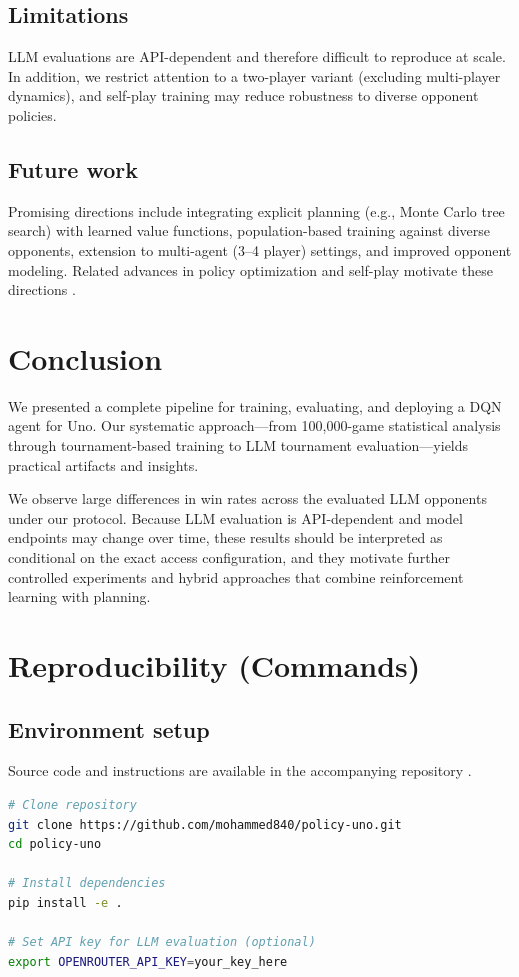 \documentclass[11pt]{article}
\begin{document}
\subsection{Limitations}
LLM evaluations are API-dependent and therefore difficult to reproduce at scale. In addition, we restrict attention to a two-player variant (excluding multi-player dynamics), and self-play training may reduce robustness to diverse opponent policies.

\subsection{Future work}
Promising directions include integrating explicit planning (e.g., Monte Carlo tree search) with learned value functions, population-based training against diverse opponents, extension to multi-agent (3--4 player) settings, and improved opponent modeling. Related advances in policy optimization and self-play motivate these directions \parencite{schulman2017ppo,silver2017mastering}.

\section{Conclusion}
We presented a complete pipeline for training, evaluating, and deploying a DQN agent for Uno. Our systematic approach---from 100{,}000-game statistical analysis through tournament-based training to LLM tournament evaluation---yields practical artifacts and insights.

We observe large differences in win rates across the evaluated LLM opponents under our protocol. Because LLM evaluation is API-dependent and model endpoints may change over time, these results should be interpreted as conditional on the exact access configuration, and they motivate further controlled experiments and hybrid approaches that combine reinforcement learning with planning.

\FloatBarrier
\clearpage
{}
\nocite{final79_2}
\printbibliography[heading=bibintoc,title={References}]
\clearpage

\appendix
\section{Reproducibility (Commands)}
\subsection{Environment setup}
Source code and instructions are available in the accompanying repository \parencite{policyuno_repo}.
\begin{lstlisting}[language=bash]
# Clone repository
git clone https://github.com/mohammed840/policy-uno.git
cd policy-uno

# Install dependencies
pip install -e .

# Set API key for LLM evaluation (optional)
export OPENROUTER_API_KEY=your_key_here
\end{lstlisting}
\end{document}
